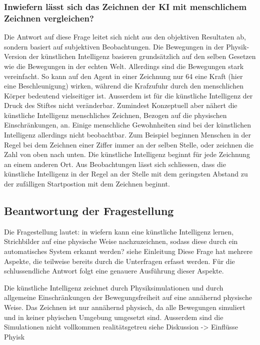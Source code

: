 \subsubsection*{Inwiefern lässt sich das Zeichnen der KI mit menschlichem Zeichnen vergleichen?}
\label{subsub:d_frage_unter_6}
Die Antwort auf diese Frage leitet sich nicht aus den objektiven Resultaten
ab, sondern basiert auf subjektiven Beobachtungen. Die Bewegungen in der
Physik-Version der künstlichen Intelligenz basieren grundsätzlich auf den
selben Gesetzen wie die Bewegungen in der echten Welt. Allerdings sind die
Bewegungen stark vereinfacht. So kann auf den Agent in einer Zeichnung nur 64
eine Kraft (hier eine Beschleunigung) wirken, während die Krafzufuhr durch den
menschlichen Körper bedeutend vielseitiger ist. Ausserdem ist für die
künstliche Intelligenz der Druck des Stiftes nicht veränderbar. Zumindest
Konzeptuell aber nähert die künstliche Intelligenz menschliches Zeichnen,
Bezogen auf die physischen Einschränkungen, an. Einige menschliche
Gewohnheiten sind bei der künstlichen Intelligenz allerdings nicht
beobachtbar. Zum Beispiel beginnen Menschen in der Regel bei dem Zeichnen
einer Ziffer immer an der selben Stelle, oder zeichnen die Zahl von oben nach
unten. Die künstliche Intelligenz beginnt für jede Zeichnung an einem anderen
Ort. Aus Beobachtungen lässt sich schliessen, dass die künstliche Intelligenz
in der Regel an der Stelle mit dem geringsten Abstand zu der zufälligen
Startpostion mit dem Zeichnen beginnt.


\subsection{Beantwortung der Fragestellung}
\label{sub:d_frage_frag}
Die Fragestellung lautet: in wiefern kann eine künstliche Intelligenz lernen,
Strichbilder auf eine physische Weise nachzuzeichnen, sodass diese durch ein
automatisches System erkannt werden? {siehe Einleitung} Diese Frage hat mehrere
Aspekte, die teilweise bereits durch die Unterfragen erfasst werden. Für die
schlussendliche Antwort folgt eine genauere Ausführung dieser Aspekte.

Die künstliche Intelligenz zeichnet durch Physiksimulationen und durch allgemeine
Einschränkungen der Bewegungsfreiheit auf eine annähernd physische Weise. Das
Zeichnen ist nur annähernd physisch, da alle Bewegungen simuliert und in
keiner phyischen Umgebung umgesetzt sind. Ausserdem sind die Simulationen
nicht vollkommen realitätsgetreu {siehe Diskussion -> Einflüsse Phyisk }

